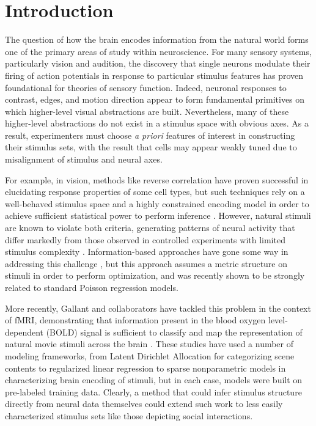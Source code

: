 \documentclass[12pt,a4paper]{article}
\begin{document}
\linenumbers

\section*{Introduction}
The question of how the brain encodes information from the natural world forms one of the primary areas of study within neuroscience. For many sensory systems, particularly vision and audition, the discovery that single neurons modulate their firing of action potentials in response to particular stimulus features has proven foundational for theories of sensory function. Indeed, neuronal responses to contrast, edges, and motion direction appear to form fundamental primitives on which higher-level visual abstractions are built. Nevertheless, many of these higher-level abstractions do not exist in a stimulus space with obvious axes. As a result, experimenters must choose \emph{a priori} features of interest in constructing their stimulus sets, with the result that cells may appear weakly tuned due to misalignment of stimulus and neural axes.

For example, in vision, methods like reverse correlation have proven successful in elucidating response properties of some cell types, but such techniques rely on a well-behaved stimulus space and a highly constrained encoding model in order to achieve sufficient statistical power to perform inference \cite{steveninck1988realtime,ringach2004reverse,ringach2002receptive}. However, natural stimuli are known to violate both criteria, generating patterns of neural activity that differ markedly from those observed in controlled experiments with limited stimulus complexity \cite{ringach2002receptive,sharpee2004analyzing,Vinje2000-dx}. Information-based approaches have gone some way in addressing this challenge \cite{sharpee2004analyzing}, but this approach assumes a metric structure on stimuli in order to perform optimization, and was recently shown to be strongly related to standard Poisson regression models\cite{Williamson2013-rg}.

More recently, Gallant and collaborators have tackled this problem in the context of fMRI, demonstrating that information present in the blood oxygen level-dependent (BOLD) signal is sufficient to classify and map the representation of natural movie stimuli across the brain \cite{Vu2011-da,Huth2012-cj,Stansbury2013-nm}. These studies have used a number of modeling frameworks, from Latent Dirichlet Allocation for categorizing scene contents \cite{Stansbury2013-nm} to regularized linear regression \cite{Huth2012-cj} to sparse nonparametric models \cite{Vu2011-da} in characterizing brain encoding of stimuli, but in each case, models were built on pre-labeled training data. Clearly, a method that could infer stimulus structure directly from neural data themselves could extend such work to less easily characterized stimulus sets like those depicting social interactions.
\end{document}
